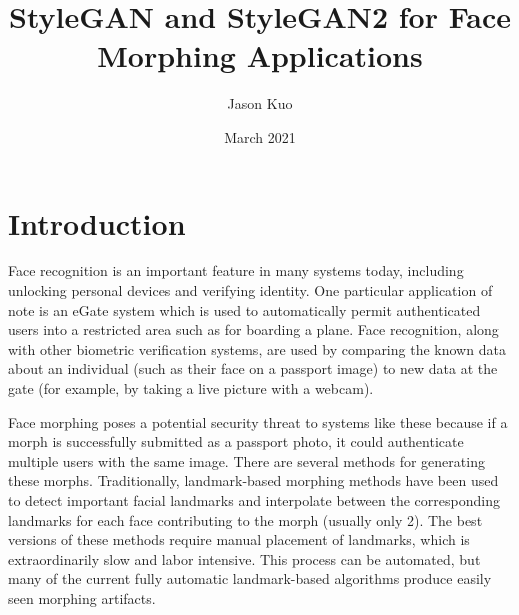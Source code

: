 \documentclass[12pt]{article}
\begin{document}
\title{StyleGAN and StyleGAN2 for Face Morphing Applications}
\author{Jason Kuo}
\date{March 2021}
\maketitle

\begin{abstract}
\end{abstract}

\section{Introduction}
\par
Face recognition is an important feature in many systems today, including unlocking personal devices and verifying identity. One particular application of note is an eGate system which is used to automatically permit authenticated users into a restricted area such as for boarding a plane. Face recognition, along with other biometric verification systems, are used by comparing the known data about an individual (such as their face on a passport image) to new data at the gate (for example, by taking a live picture with a webcam).
\par
Face morphing poses a potential security threat to systems like these because if a morph is successfully submitted as a passport photo, it could authenticate multiple users with the same image. There are several methods for generating these morphs. Traditionally, landmark-based morphing methods have been used to detect important facial landmarks and interpolate between the corresponding landmarks for each face contributing to the morph (usually only 2). The best versions of these methods require manual placement of landmarks, which is extraordinarily slow and labor intensive. This process can be automated, but many of the current fully automatic landmark-based algorithms produce easily seen morphing artifacts.
\par
\end{document}
